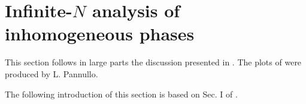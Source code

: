 \newcommand{\pbArrow}{\,\leftrightarrow\,}

\newcommand{\xTwo}{\ensuremath{\tau}}

\newcommand{\xOne}[1]{\ensuremath{#1}}
\newcommand{\ta}[1]{\ensuremath{\xTwo_{#1}}}

\newcommand{\te}{\ensuremath{\ta{x}} }
\newcommand{\ex}{\ensuremath{\xOne{x}}}

\newcommand{\st}[1]{\ensuremath{\mathbf{#1}}}
\newcommand{\xst}{\ensuremath{\st{x}}}

\newcommand{\Hom}[1]{\ensuremath{\bar{#1}}}

\newcommand{\s}{\ensuremath{\sigma}}
\newcommand{\stilde}{\ensuremath{\tilde{\s}}}
\newcommand{\shom}{\ensuremath{\Hom{\s}}}
\newcommand{\smin}{\ensuremath{\Sigma}}
\newcommand{\sminhom}{\ensuremath{\Hom{\smin}}}
\newcommand{\snull}{\ensuremath{\sminhom_0}}

\newcommand{\ds}{\ensuremath{\delta \s}}
\newcommand{\dsx}[1]{\ensuremath{\ds(#1)}}
\newcommand{\dst}{\ensuremath{\delta \stilde}}
\newcommand{\dstx}[1]{\ensuremath{\dst(#1)}}

\newcommand{\qs}{\ensuremath{q_{\smin}}}
\renewcommand{\S}{\mathcal{S}}
\newcommand{\seff}{\mathcal{S}_{\text{eff}}}
\newcommand{\Z}{\ensuremath{\mathds{Z}}}
\newcommand{\gp}{\ensuremath{U}}
\newcommand{\gphom}{\ensuremath{\Hom{\gp}}}
\newcommand{\coupling}{\ensuremath{g^2}}
\newcommand{\rscoupling}{\ensuremath{g^2}}
\newcommand{\grandp}{\ensuremath{\Omega}}
\newcommand{\grandphom}{\ensuremath{\Hom{\grandp}}}

\newcommand{\energy}[1]{\ensuremath{E_{#1}}}

\newcommand{\gch}{\ensuremath{\gamma^\mathrm{ch}}}
\newcommand{\dop}{\ensuremath{D}}
\newcommand{\dophom}{\ensuremath{\Hom{\dop}}}

\newcommand{\gtwo}{\ensuremath{\Gamma^{(2)}}}
\newcommand{\gtwovar}[4]{\ensuremath{\gtwo ( #1, #2, #3, #4)}}
\newcommand{\gtwovardef}{\ensuremath{\gtwovar{\shom}{\mu}{T}{q}}}
\newcommand{\qmin}{\ensuremath{Q}}

\newcommand{\zwave}[3]{\ensuremath{Z ( #1, #2, #3 )}}

\section{Infinite-\texorpdfstring{$N$}{N} analysis of inhomogeneous phases}\label{sec:gnInfInhomo}
\begin{disclaimer}
	This section follows in large parts the discussion presented in .
	The plots of  were produced by L. Pannullo.

	The following introduction of this section is based on Sec. I of .
\end{disclaimer}

